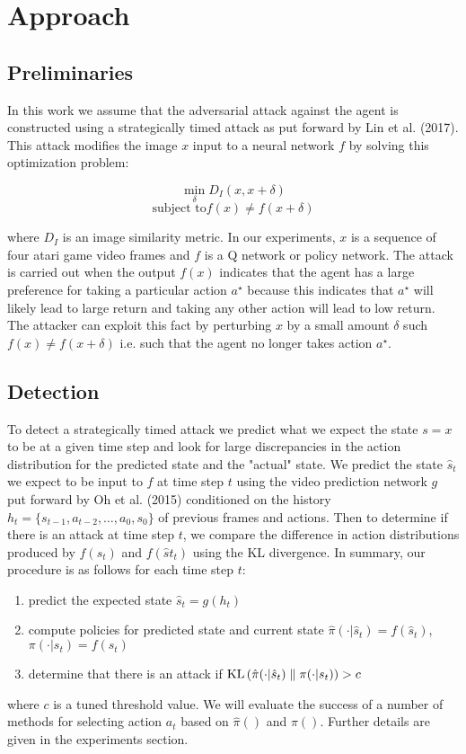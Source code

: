 \section{Approach}

\subsection{Preliminaries}
In this work we assume that the adversarial attack against the agent
is constructed using a strategically timed attack as put forward by
Lin et al. (2017). This attack modifies the image $x$ input to a neural network
$f$ by solving this optimization problem:

$$\min_{\delta}{D_I(x, x + \delta)}$$
$$\mbox{subject to} f(x) \neq f(x + \delta)$$

where $D_I$ is an image similarity metric.
In our experiments, $x$ is a sequence of four atari game video frames
and $f$ is a Q network or policy network. The attack is carried out when
the output $f(x)$ indicates that the agent has a large preference for
taking a particular action $a^\star$ because this indicates that $a^\star$
will likely lead to large return and taking any other action will lead to
low return. The attacker can exploit this fact by perturbing $x$ by a small
amount $\delta$ such $f(x) \neq f(x + \delta)$ i.e. such that the agent no longer
takes action $a^\star$.

\subsection{Detection}
To detect a strategically timed attack we predict what we expect the state $s = x$
to be at a given time step and look for large discrepancies in the
action distribution for the predicted state and the "actual" state.
We predict the state $\hat s_t$ we expect to be input to $f$ at time step $t$
using the video prediction network $g$ put forward by Oh et al. (2015)
conditioned on the history $h_t = \{s_{t-1}, a_{t-2}, \dots, a_0, s_0\}$ of
previous frames and actions. Then to determine if there is an attack
at time step $t$, we compare the difference in action distributions
produced by $f(s_t)$ and $f(\hat st_t)$ using the \textrm{KL} divergence.
In summary, our procedure is as follows for each time step $t$:
\begin{enumerate}
    \item predict the expected state $\hat s_t = g(h_t)$
    \item compute policies for predicted state and current state $\hat \pi( \cdot \vert \hat s_t) = f(\hat s_t)$, $\pi( \cdot \vert s_t) = f(s_t)$
    \item determine that there is an attack if $\textrm{KL}\left(\hat \pi( \cdot \vert \hat s_t)\;\|\;\pi( \cdot \vert s_t)\right) > c$
\end{enumerate}
where $c$ is a tuned threshold value. We will evaluate the success of a number of methods for selecting action $a_t$
based on $\hat \pi()$ and $\pi()$. Further details are given in the experiments section.

